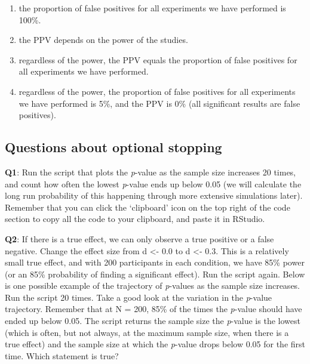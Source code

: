 \documentclass[
  oneside]{krantz}
\providecommand{\tightlist}{%
  \setlength{\itemsep}{0pt}\setlength{\parskip}{0pt}}
\begin{document}
\begin{enumerate}
\def\labelenumi{\Alph{enumi})}
\tightlist
\item
  the proportion of false positives for all experiments we have performed is 100\%.
\item
  the PPV depends on the power of the studies.
\item
  regardless of the power, the PPV equals the proportion of false positives for all experiments we have performed.
\item
  regardless of the power, the proportion of false positives for all experiments we have performed is 5\%, and the PPV is 0\% (all significant results are false positives).
\end{enumerate}

\hypertarget{questions-about-optional-stopping}{%
\subsection{Questions about optional stopping}\label{questions-about-optional-stopping}}

\textbf{Q1}: Run the script that plots the \emph{p}-value as the sample size increases 20 times, and count how often the lowest \emph{p}-value ends up below 0.05 (we will calculate the long run probability of this happening through more extensive simulations later). Remember that you can click the `clipboard' icon on the top right of the code section to copy all the code to your clipboard, and paste it in RStudio.

\textbf{Q2}: If there is a true effect, we can only observe a true positive or a false negative. Change the effect size from d \textless- 0.0 to d \textless- 0.3. This is a relatively small true effect, and with 200 participants in each condition, we have 85\% power (or an 85\% probability of finding a significant effect). Run the script again. Below is one possible example of the trajectory of \emph{p}-values as the sample size increases. Run the script 20 times. Take a good look at the variation in the \emph{p}-value trajectory. Remember that at N = 200, 85\% of the times the \emph{p}-value should have ended up below 0.05. The script returns the sample size the \emph{p}-value is the lowest (which is often, but not always, at the maximum sample size, when there is a true effect) and the sample size at which the \emph{p}-value drops below 0.05 for the first time. Which statement is true?
\end{document}
